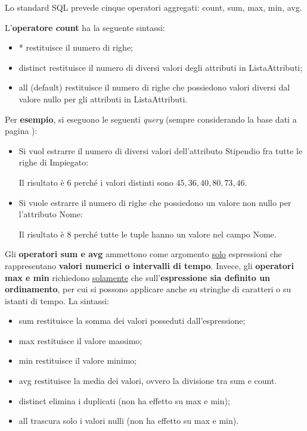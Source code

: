 \documentclass[a4paper]{article}
\begin{document}
	Lo standard SQL prevede cinque operatori aggregati: \textsf{count}, \textsf{sum}, \textsf{max}, \textsf{min}, \textsf{avg}.\newline
	
	\noindent
	L'\textbf{operatore \textcolor{Red3}{\textsf{count}}} ha la seguente sintassi:
	
	\begin{itemize}
		\item * restituisce il numero di righe;
		\item \textsf{distinct} restituisce il numero di diversi valori degli attributi in \textsf{ListaAttributi};
		\item \textsf{all} (default) restituisce il numero di righe che possiedono valori diversi dal valore nullo per gli attributi in \textsf{ListaAttributi}.
	\end{itemize}
	Per \textcolor{Green4}{\textbf{esempio}}, si eseguono le seguenti \emph{query} (sempre considerando la base dati a pagina \pageref{img: select dbms}):
	\begin{itemize}
		\item Si vuol estrarre il numero di diversi valori dell'attributo \textsf{Stipendio} fra tutte le righe di \textsf{Impiegato}:
		
		Il risultato è $6$ perché i valori distinti sono $45, 36, 40, 80, 73, 46$.
		
		\item Si vuole estrarre il numero di righe che possiedono un valore non nullo per l'attributo \textsf{Nome}:
		
		Il risultato è $8$ perché tutte le tuple hanno un valore nel campo \textsf{Nome}.
	\end{itemize}\:\newline
	
	\noindent
	Gli \textbf{operatori \textcolor{Red3}{\textsf{sum}} e \textcolor{Red3}{\textsf{avg}}} ammettono come argomento \underline{solo} espressioni che rappresentano \textbf{valori numerici o intervalli di tempo}. Invece, gli \textbf{operatori \textcolor{Red3}{\textsf{max}} e \textcolor{Red3}{\textsf{min}}} richiedono \underline{solamente} che sull'\textbf{espressione sia definito un ordinamento}, per cui si possono applicare anche su stringhe di caratteri o su istanti di tempo. La sintassi:
	
	\begin{itemize}
		\item \textsf{sum} restituisce la somma dei valori posseduti dall'espressione;
		\item \textsf{max} restituisce il valore massimo;
		\item \textsf{min} restituisce il valore minimo;
		\item \textsf{avg} restituisce la media dei valori, ovvero la divisione tra \textsf{sum} e \textsf{count}.
		\item \textsf{distinct} elimina i duplicati (non ha effetto su \textsf{max} e \textsf{min});
		\item \textsf{all} trascura solo i valori nulli (non ha effetto su \textsf{max} e \textsf{min}).
	\end{itemize}\newpage
	
\end{document}
